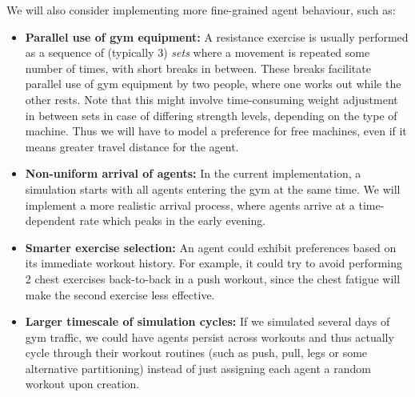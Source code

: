 \documentclass[9pt]{pnas-new}
\begin{document}
We will also consider implementing more fine-grained agent behaviour, such as:
\begin{itemize}
	\item {\bf Parallel use of gym equipment:} A resistance exercise is usually performed as a sequence of (typically 3) {\it sets} where a movement is repeated some number of times, with short breaks in between. These breaks facilitate parallel use of gym equipment by two people, where one works out while the other rests. Note that this might involve time-consuming weight adjustment in between sets in case of differing strength levels, depending on the type of machine. Thus we will have to model a preference for free machines, even if it means greater travel distance for the agent.
	\item {\bf Non-uniform arrival of agents:} In the current implementation, a simulation starts with all agents entering the gym at the same time. We will implement a more realistic arrival process, where agents arrive at a time-dependent rate which peaks in the early evening.
	\item {\bf Smarter exercise selection:} An agent could exhibit preferences based on its immediate workout history. For example, it could try to avoid performing 2 chest exercises back-to-back in a push workout, since the chest fatigue will make the second exercise less effective.
	\item {\bf Larger timescale of simulation cycles:} If we simulated several days of gym traffic, we could have agents persist across workouts and thus actually cycle through their workout routines (such as push, pull, legs or some alternative partitioning) instead of just assigning each agent a random workout upon creation.
\end{itemize}



\showacknow %


\begin{multicols}{2}
\section*{\bibname}

\end{multicols}
\end{document}
